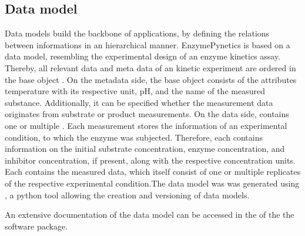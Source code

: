 \documentclass[letterpaper,10pt,english]{jupyterBook}
\begin{document}
\subsection{Data model}
\label{\detokenize{methods:data-model}}
\sphinxAtStartPar
Data models build the backbone of applications, by defining the relations between informations in an hierarchical manner.
EnzymePynetics is based on a data model, resembling the experimental design of an enzyme kinetics assay. Thereby, all relevant data and meta data of an kinetic experiment are ordered in the base object . On the metadata side, the base object consists of the attributes temperature with its respective unit, pH, and the name of the measured substance. Additionally, it can be specified whether the measurement data originates from substrate or product measurements. On the data side,  contains one or multiple . Each measurement stores the information of an experimental condition, to which the enzyme was subjected. Therefore, each  contains information on the initial substrate concentration, enzyme concentration, and inhibitor concentration, if present, along with the respective concentration units. Each  contains the measured data, which itself consist of one or multiple replicates of the respective experimental condition.The data model was was generated using , a python tool allowing the creation and versioning of data models.

\sphinxAtStartPar
An extensive documentation of the data model can be accessed in the  of the the software package.
\end{document}
